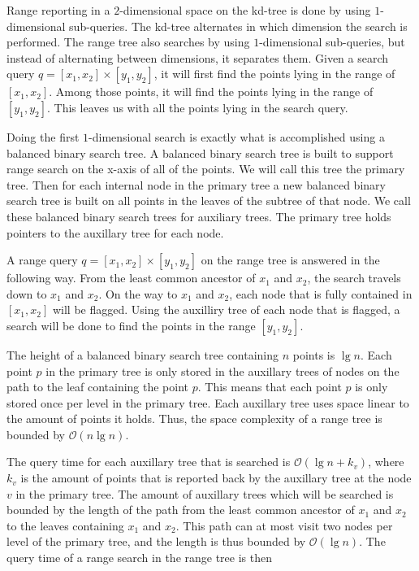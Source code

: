 Range reporting in a $2$-dimensional space on the kd-tree is done by using $1$-dimensional sub-queries. The kd-tree alternates in which dimension the search is performed. The range tree also searches by using $1$-dimensional sub-queries, but instead of alternating between dimensions, it separates them. Given a search query $q = [x_1, x_2] \times [y_1, y_2]$, it will first find the points lying in the range of $[x_1, x_2]$. Among those points, it will find the points lying in the range of $[y_1, y_2]$. This leaves us with all the points lying in the search query.

Doing the first $1$-dimensional search is exactly what is accomplished using a balanced binary search tree. A balanced binary search tree is built to support range search on the x-axis of all of the points. We will call this tree the primary tree. Then for each internal node in the primary tree a new balanced binary search tree is built on all points in the leaves of the subtree of that node. We call these balanced binary search trees for auxiliary trees. The primary tree holds pointers to the auxillary tree for each node.

A range query $q = [x_1, x_2] \times [y_1, y_2]$ on the range tree is answered in the following way. From the least common ancestor of $x_1$ and $x_2$, the search travels down to $x_1$ and $x_2$. On the way to $x_1$ and $x_2$, each node that is fully contained in $[x_1, x_2]$ will be flagged. Using the auxilliry tree of each node that is flagged, a search will be done to find the points in the range $[y_1, y_2]$.

The height of a balanced binary search tree containing $n$ points is $\lg n$. Each point $p$ in the primary tree is only stored in the auxillary trees of nodes on the path to the leaf containing the point $p$. This means that each point $p$ is only stored once per level in the primary tree. Each auxillary tree uses space linear to the amount of points it holds. Thus, the space complexity of a range tree is bounded by $\mathcal{O}(n \lg n)$.

The query time for each auxillary tree that is searched is $\mathcal{O}(\lg n + k_v)$, where $k_v$ is the amount of points that is reported back by the auxillary tree at the node $v$ in the primary tree. The amount of auxillary trees which will be searched is bounded by the length of the path from the least common ancestor of $x_1$ and $x_2$ to the leaves containing $x_1$ and $x_2$. This path can at most visit two nodes per level of the primary tree, and the length is thus bounded by $\mathcal{O}(\lg n)$. The query time of a range search in the range tree is then 

